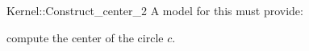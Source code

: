 \begin{ccRefFunctionObjectConcept}{Kernel::Construct_center_2}
A model for this must provide:


 {compute the center of the circle $c$.}

\ccIsModel{}

\end{ccRefFunctionObjectConcept}
